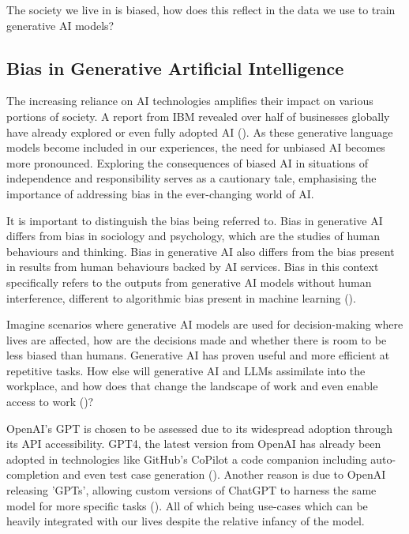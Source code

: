 \documentclass[12pt]{article}
\begin{document}
The society we live in is biased, how does this reflect in the data we use to train generative AI models?

\newpage

\subsection{Bias in Generative Artificial Intelligence}

The increasing reliance on AI technologies amplifies their impact on various portions of society. A report from IBM revealed over half of businesses globally have already explored or even fully adopted AI (\cite{ibm-2022}). As these generative language models become included in our experiences, the need for unbiased AI becomes more pronounced. Exploring the consequences of biased AI in situations of independence and responsibility serves as a cautionary tale, emphasising the importance of addressing bias in the ever-changing world of AI. 

It is important to distinguish the bias being referred to. Bias in generative AI differs from bias in sociology and psychology, which are the studies of human behaviours and thinking. Bias in generative AI also differs from the bias present in results from human behaviours backed by AI services. Bias in this context specifically refers to the outputs from generative AI models without human interference, different to algorithmic bias present in machine learning (\cite{deery-2022}).

Imagine scenarios where generative AI models are used for decision-making where lives are affected, how are the decisions made and whether there is room to be less biased than humans. Generative AI has proven useful and more efficient at repetitive tasks. How else will generative AI and LLMs assimilate into the workplace, and how does that change the landscape of work and even enable access to work (\cite{de-cremer-2021})? 

OpenAI’s GPT is chosen to be assessed due to its widespread adoption through its API accessibility. GPT4, the latest version from OpenAI has already been adopted in technologies like GitHub’s CoPilot a code companion including auto-completion and even test case generation (\cite{lardinois-no-date}). Another reason is due to OpenAI releasing 'GPTs', allowing custom versions of ChatGPT to harness the same model for more specific tasks (\cite{openai-no-date}). All of which being use-cases which can be heavily integrated with our lives despite the relative infancy of the model.
\end{document}
